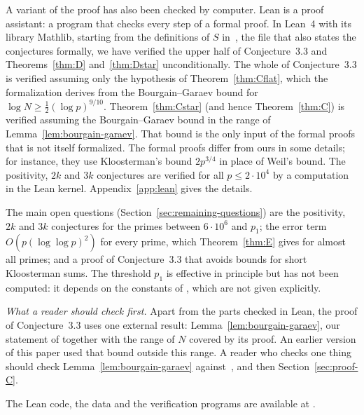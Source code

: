 A variant of the proof has also been checked by computer. Lean is a proof assistant: a program that checks every step of a formal proof. In Lean~4 with its library Mathlib, starting from the definitions of $S$ in~\cite{b11}, the file that also states the conjectures formally, we have verified the upper half of Conjecture~3.3 and Theorems~\ref{thm:D} and~\ref{thm:Dstar} unconditionally. The whole of Conjecture~3.3 is verified assuming only the hypothesis of Theorem~\ref{thm:Cflat}, which the formalization derives from the Bourgain--Garaev bound for $\log N\ge\frac12(\log p)^{9/10}$. Theorem~\ref{thm:Cstar} (and hence Theorem~\ref{thm:C}) is verified assuming the Bourgain--Garaev bound in the range of Lemma~\ref{lem:bourgain-garaev}. That bound is the only input of the formal proofs that is not itself formalized. The formal proofs differ from ours in some details; for instance, they use Kloosterman's bound $2p^{3/4}$ in place of Weil's bound. The positivity, $2k$ and $3k$ conjectures are verified for all $p\le2\cdot10^4$ by a computation in the Lean kernel. Appendix~\ref{app:lean} gives the details.

The main open questions (Section~\ref{sec:remaining-questions}) are the positivity, $2k$ and $3k$ conjectures for the primes between $6\cdot10^6$ and $p_1$; the error term $O(p(\log\log p)^2)$ for every prime, which Theorem~\ref{thm:E} gives for almost all primes; and a proof of Conjecture~3.3 that avoids bounds for short Kloosterman sums. The threshold $p_1$ is effective in principle but has not been computed: it depends on the constants of \cite[Theorem~16]{b8}, which are not given explicitly.

\emph{What a reader should check first.} Apart from the parts checked in Lean, the proof of Conjecture~3.3 uses one external result: Lemma~\ref{lem:bourgain-garaev}, our statement of \cite[Theorem~16]{b8} together with the range of $N$ covered by its proof. An earlier version of this paper used that bound outside this range. A reader who checks one thing should check Lemma~\ref{lem:bourgain-garaev} against~\cite{b8}, and then Section~\ref{sec:proof-C}.

The Lean code, the data and the verification programs are available at \zenododoi.

